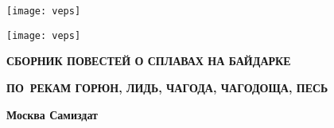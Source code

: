 \BgThispage %
\begin{titlepage}
	\newpage
	\begin{center}
		\huge \textbf \MyVarAuthorName
	\end{center}	
	\vspace{1.75cm}	
	\begin{center}
	\texttt{[image: veps]}
	\end{center}	
	\begin{center}
		\Huge{}
	\end{center}	
%
	\begin{center}
	\texttt{[image: veps]}
	\end{center}
%
	\begin{center}
		\footnotesize
%	
		{
		\textbf{СБОРНИК ПОВЕСТЕЙ О СПЛАВАХ НА БАЙДАРКЕ}}
		
		{
		\textbf{ПО~РЕКАМ ГОРЮН, ЛИДЬ, ЧАГОДА, ЧАГОДОЩА, ПЕСЬ}}		
	\end{center}
%
	\vspace{\fill}	
	\begin{center}
		\small\textbf{
		Москва  \linebreak
		Самиздат}
	\end{center}	
\end{titlepage}